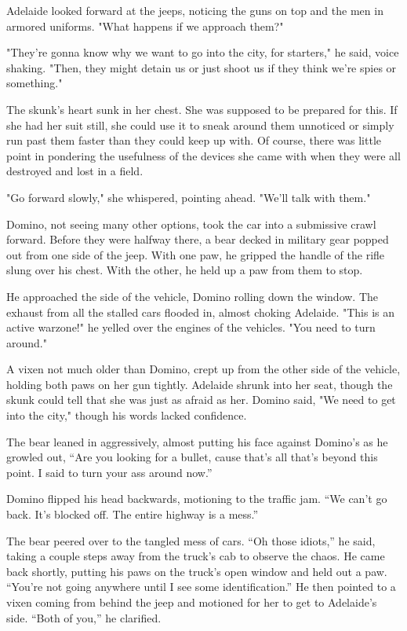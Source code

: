 Adelaide looked forward at the jeeps, noticing the guns on top and the men in armored uniforms. "What happens if we approach them?"

"They're gonna know why we want to go into the city, for starters," he said, voice shaking. "Then, they might detain us or just shoot us if they think we're spies or something."

The skunk's heart sunk in her chest. She was supposed to be prepared for this. If she had her suit still, she could use it to sneak around them unnoticed or simply run past them faster than they could keep up with. Of course, there was little point in pondering the usefulness of the devices she came with when they were all destroyed and lost in a field.

"Go forward slowly," she whispered, pointing ahead. "We'll talk with them."

Domino, not seeing many other options, took the car into a submissive crawl forward. Before they were halfway there, a bear decked in military gear popped out from one side of the jeep. With one paw, he gripped the handle of the rifle slung over his chest. With the other, he held up a paw from them to stop.

He approached the side of the vehicle, Domino rolling down the window. The exhaust from all the stalled cars flooded in, almost choking Adelaide. "This is an active warzone!" he yelled over the engines of the vehicles. "You need to turn around."

A vixen not much older than Domino, crept up from the other side of the vehicle, holding both paws on her gun tightly. Adelaide shrunk into her seat, though the skunk could tell that she was just as afraid as her. Domino said, "We need to get into the city," though his words lacked confidence.

The bear leaned in aggressively, almost putting his face against Domino's as he growled out, ``Are you looking for a bullet, cause that's all that's beyond this point. I said to turn your ass around now.''

Domino flipped his head backwards, motioning to the traffic jam. ``We can't go back. It's blocked off. The entire highway is a mess.''

The bear peered over to the tangled mess of cars. ``Oh those idiots,'' he said, taking a couple steps away from the truck's cab to observe the chaos. He came back shortly, putting his paws on the truck's open window and held out a paw. ``You're not going anywhere until I see some identification.'' He then pointed to a vixen coming from behind the jeep and motioned for her to get to Adelaide's side. ``Both of you,'' he clarified.

